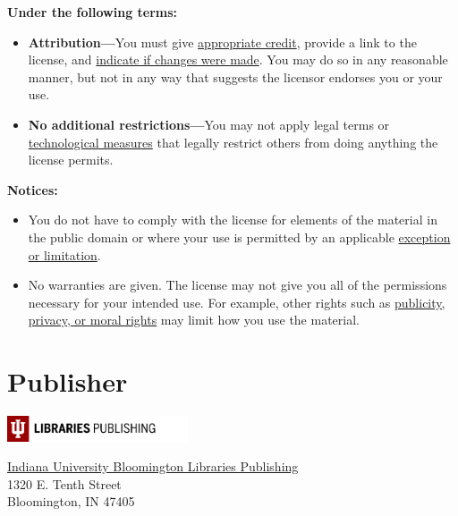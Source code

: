\documentclass[
  letterpaper,
]{book}
\providecommand{\tightlist}{%
  \setlength{\itemsep}{0pt}\setlength{\parskip}{0pt}}\usepackage{longtable,booktabs,array}
\begin{document}
\textbf{Under the following terms:}

\begin{itemize}
\tightlist
\item
  \textbf{Attribution---}You must give
  \href{https://creativecommons.org/licenses/by/4.0/\#ref-appropriate-credit}{appropriate
  credit}, provide a link to the license, and
  \href{https://creativecommons.org/licenses/by/4.0/\#ref-indicate-changes}{indicate
  if changes were made}. You may do so in any reasonable manner, but not
  in any way that suggests the licensor endorses you or your use.\\
\item
  \textbf{No additional restrictions---}You may not apply legal terms or
  \href{https://creativecommons.org/licenses/by/4.0/\#ref-technological-measures}{technological
  measures} that legally restrict others from doing anything the license
  permits.
\end{itemize}

\textbf{Notices:}

\begin{itemize}
\tightlist
\item
  You do not have to comply with the license for elements of the
  material in the public domain or where your use is permitted by an
  applicable
  \href{https://creativecommons.org/licenses/by/4.0/\#ref-exception-or-limitation}{exception
  or limitation}.\\
\item
  No warranties are given. The license may not give you all of the
  permissions necessary for your intended use. For example, other rights
  such as
  \href{https://creativecommons.org/licenses/by/4.0/\#ref-publicity-privacy-or-moral-rights}{publicity,
  privacy, or moral rights} may limit how you use the material.
\end{itemize}

\section*{Publisher}\label{publisher}


\includegraphics[width=0.4\textwidth,height=\textheight]{images/iublpub_logo.png}

\href{https://libraries.indiana.edu/scholarly-communication}{Indiana
University Bloomington Libraries Publishing}\\
1320 E. Tenth Street\\
Bloomington, IN 47405
\end{document}
